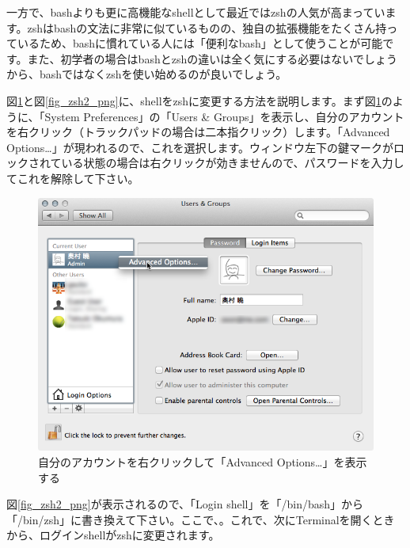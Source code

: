 一方で、bashよりも更に高機能なshellとして最近ではzshの人気が高まっています。zshはbashの文法に非常に似ているものの、独自の拡張機能をたくさん持っているため、bashに慣れている人には「便利なbash」として使うことが可能です。また、初学者の場合はbashとzshの違いは全く気にする必要はないでしょうから、bashではなくzshを使い始めるのが良いでしょう。

図\ref{fig_zsh1_png}と図\ref{fig_zsh2_png}に、shellをzshに変更する方法を説明します。まず図\ref{fig_zsh1_png}のように、「System Preferences」の「Users & Groups」を表示し、自分のアカウントを右クリック（トラックパッドの場合は二本指クリック）します。「Advanced Options\ldots」が現われるので、これを選択します。ウィンドウ左下の鍵マークがロックされている状態の場合は右クリックが効きませんので、パスワードを入力してこれを解除して下さい。

\begin{figure}
  \begin{center}
    \includegraphics[scale=0.35,bb= 0 0 668 504]{fig/zsh1.png}
    \caption{自分のアカウントを右クリックして「Advanced Options\ldots」を表示する}
    \label{fig_zsh1_png}
  \end{center}
\end{figure}

図\ref{fig_zsh2_png}が表示されるので、「Login shell」を「/bin/bash」から「/bin/zsh」に書き換えて下さい。ここで、{\bf{}}。これで、次にTerminalを開くときから、ログインshellがzshに変更されます。

